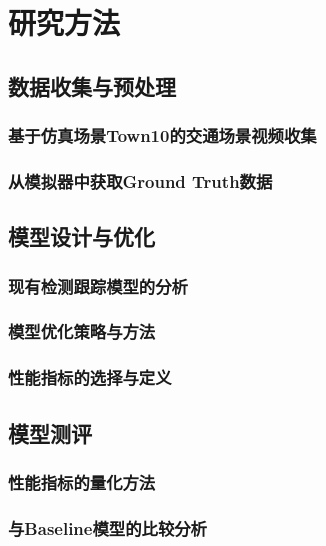 \chapter{研究方法}



\section{数据收集与预处理}



\subsection{基于仿真场景Town10的交通场景视频收集}



\subsection{从模拟器中获取Ground Truth数据}



\section{模型设计与优化}



\subsection{现有检测跟踪模型的分析}



\subsection{模型优化策略与方法}



\subsection{性能指标的选择与定义}


\section{模型测评}


\subsection{性能指标的量化方法}


\subsection{与Baseline模型的比较分析}